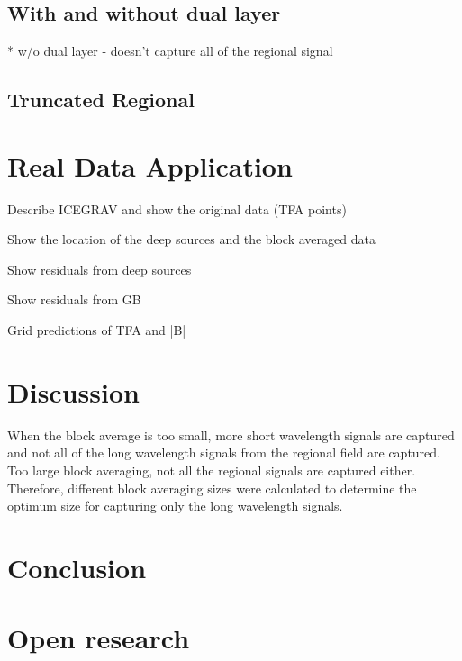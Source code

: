 \subsection{With and without dual layer}
* w/o dual layer - doesn't capture all of the regional signal

\subsection{Truncated Regional}


\section{Real Data Application}

Describe ICEGRAV and show the original data (TFA points)

Show the location of the deep sources and the block averaged data

Show residuals from deep sources

Show residuals from GB

Grid predictions of TFA and |B|


\section{Discussion}

When the block average is too small, more short wavelength signals are captured and not all of the long wavelength signals from the regional field are captured. Too large block averaging, not all the regional signals are captured either. Therefore, different block averaging sizes were calculated to determine the optimum size for capturing only the long wavelength signals.


\section{Conclusion}

\lipsum[1]


\section{Open research}

